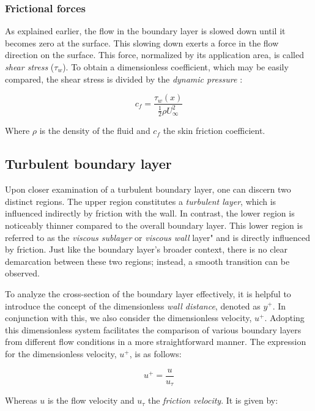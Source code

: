 \subsubsection{Frictional forces}
As explained earlier, the flow in the boundary layer is slowed down until it
becomes zero at the surface. This slowing down exerts a force in the flow
direction on the surface. This force, normalized by its application area, is
called \textit{shear stress} ($\tau_{w}$). To obtain a dimensionless
coefficient, which may be easily compared, the shear stress is divided by the
\textit{dynamic pressure} \cite{Schlichting2018}:

\begin{equation}
  c_{f} = \frac{\tau_{w}(x)}{\frac{1}{2}\rho U_{\infty}^{2}}
\end{equation}

\noindent Where $\rho$ is the density of the fluid and $c_{f}$ the skin friction
coefficient.


\subsection{Turbulent boundary layer}
\label{sec:turbulent_BL}
Upon closer examination of a turbulent boundary layer, one can discern two
distinct regions. The upper region constitutes a \textit{turbulent layer},
which is influenced indirectly by friction with the wall. In contrast, the
lower region is noticeably thinner compared to the overall boundary layer. This
lower region is referred to as the \textit{viscous sublayer} or \textit{viscous
wall} layer" and is directly influenced by friction. Just like the boundary
layer's broader context, there is no clear demarcation between these two
regions; instead, a smooth transition can be observed.

To analyze the cross-section of the boundary layer effectively, it is helpful
to introduce the concept of the dimensionless \textit{wall distance}, denoted
as $y^{+}$. In conjunction with this, we also consider the dimensionless
velocity, $u^{+}$. Adopting this dimensionless system facilitates the
comparison of various boundary layers from different flow conditions in a more
straightforward manner. The expression for the dimensionless velocity, $u^{+}$,
is as follows:  \cite{Schlichting2018}

\begin{equation}
  u^{+} = \frac{u}{u_{\tau}}
\end{equation}

\noindent Whereas $u$ is the flow velocity and $u_{\tau}$ the \textit{friction
velocity}. It is given by:

